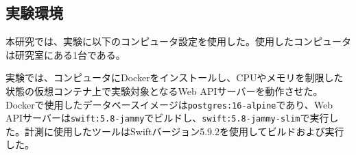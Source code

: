 \documentclass[../../../main]{subfiles}
\begin{document}
    \subsection{実験環境}\label{subsec:method-environment}

    本研究では、実験に以下のコンピュータ設定を使用した。使用したコンピュータは研究室にある1台である。

    

    実験では、コンピュータにDockerをインストールし、CPUやメモリを制限した状態の仮想コンテナ上で実験対象となるWeb APIサーバーを動作させた。Dockerで使用したデータベースイメージは\texttt{postgres:16-alpine}であり、Web APIサーバーは\texttt{swift:5.8-jammy}でビルドし、\texttt{swift:5.8-jammy-slim}で実行した。計測に使用したツールはSwiftバージョン5.9.2を使用してビルドおよび実行した。
\end{document}
